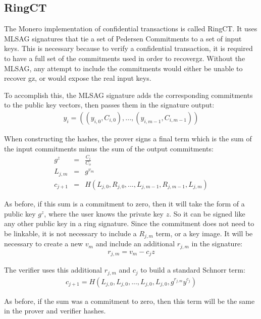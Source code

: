 \documentclass{article}
\begin{document}
\subsection{RingCT}

The Monero implementation of confidential transactions is called RingCT.  It uses MLSAG signatures that tie a set of Pedersen Commitments to a set of input keys.  This is necessary because to verify a confidential transaction, it is required to have a full set of the commitments used in order to recovergz.  Without the MLSAG, any attempt to include the commitments would either be unable to recover gz, or would expose the real input keys.

To accomplish this, the MLSAG signature adds the corresponding commitments to the public key vectors, then passes them in the signature output:
\begin{eqnarray}
  y_i = ((y_{i,0}, C_{i,0}), ..., (y_{i,m-1}, C_{i,m-1}))
\end{eqnarray}

When constructing the hashes, the prover signs a final term which is the sum of the input commitments minus the sum of the output commitments:
\begin{eqnarray}
  g^z &=& \frac{C_i}{C_o}\\
  L_{j,m} &=& g^{v_m}\\
  c_{j+1} &=& H(L_{j,0}, R_{j,0}, ... , L_{j,m-1}, R_{j, m-1}, L_{j,m})
\end{eqnarray}

As before, if this sum is a commitment to zero, then it will take the form of a public key $g^z$, where the user knows the private key $z$.  So it can be signed like any other public key in a ring signature.  Since the commitment does not need to be linkable, it is not necessary to include a $R_{j,m}$ term, or a key image.  It will be necessary to create a new $v_m$ and include an additional $r_{j,m}$ in the signature:
\begin{eqnarray}
  r_{j,m} = v_m - c_j z
\end{eqnarray}

The verifier uses this additional $r_{j,m}$ and $c_j$ to build a standard Schnorr term:
\begin{eqnarray}
  c_{j+1} = H(L_{j,0}, L_{j,0}, ... , L_{j,0}, L_{j,0}, g^{r_{j,m}} y^{c_j})
\end{eqnarray}

As before, if the sum was a commitment to zero, then this term will be the same in the prover and verifier hashes.
\end{document}
